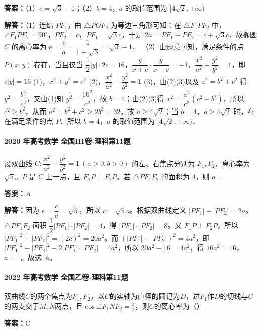 \documentclass[UTF8,a4paper,11pt]{ctexart}
\begin{document}
\textbf{答案：}（1）$e=\sqrt{3}-1$；（2）$b=4$，$a$ 的取值范围为 $[4\sqrt{2},+\infty)$\par

\textbf{解答：}（1）连结 $PF_1$，由 $\triangle POF_2$ 为等边三角形可知：在 $\triangle F_1PF_2$ 中，$\angle F_1PF_2=90^\circ$，$PF_2=c$，$PF_1=\sqrt{3}c$，于是 $2a=PF_1+PF_2=c+\sqrt{3}c$，故椭圆 $C$ 的离心率为 $e=\dfrac{c}{a}=\dfrac{1}{1+\sqrt{3}}=\sqrt{3}-1$．
（2）由题意可知，满足条件的点 $P(x,y)$ 存在，当且仅当 $\dfrac{1}{2}|y|\cdot2c=16$，$\dfrac{y}{x+c}\cdot\dfrac{y}{x-c}=-1$，$\dfrac{x^2}{a^2}+\dfrac{y^2}{b^2}=1$，即 $c|y|=16$ (1)，$x^2+y^2=c^2$ (2)，$\dfrac{x^2}{a^2}+\dfrac{y^2}{b^2}=1$ (3)，由(2)(3)以及 $a^2=b^2+c^2$ 得 $y^2=\dfrac{b^4}{c^2}$，又由(1)知 $y^2=\dfrac{16^2}{c^2}$，故 $b=4$；由(2)(3)得 $x^2=\dfrac{a^2}{c^2}(c^2-b^2)$，所以 $c^2\ge b^2$，从而 $a^2=b^2+c^2\ge 2b^2=32$，故 $a\ge 4\sqrt{2}$；当 $b=4$，$a\ge 4\sqrt{2}$ 时，存在满足条件的点 $P$．所以 $b=4$，$a$ 的取值范围为 $[4\sqrt{2},+\infty)$．

\paragraph{2020 年高考数学 全国III卷-理科第11题}

设双曲线 $C:\dfrac{x^2}{a^2}-\dfrac{y^2}{b^2}=1\ (a>0,b>0)$ 的左、右焦点分别为 $F_1,F_2$，离心率为 $\sqrt{5}$。$P$ 是 $C$ 上一点，且 $F_1P\perp F_2P$。若 $\triangle PF_1F_2$ 的面积为 $4$，则 $a=$

\textbf{答案：}$A$\par

\textbf{解答：}因为 $e=\dfrac{c}{a}=\sqrt{5}$，所以 $c=\sqrt{5}a$。根据双曲线定义 $|PF_1|-|PF_2|=2a$。$\triangle PF_1F_2$ 面积 $\dfrac12|PF_1|\cdot|PF_2|=4$，得 $|PF_1|\cdot|PF_2|=8$。又 $F_1P\perp F_2P$，所以 $|PF_1|^2+|PF_2|^2=(2c)^2=20a^2$。而 $(|PF_1|-|PF_2|)^2=4a^2$，即 $|PF_1|^2+|PF_2|^2-2|PF_1|\cdot|PF_2|=4a^2$，所以 $20a^2-16=4a^2$，得 $16a^2=16$，$a=1$。故选 $A$。

\paragraph{2022 年高考数学 全国乙卷-理科第11题}

双曲线$C$的两个焦点为$F_1, F_2$，以$C$的实轴为直径的圆记为$D$，过$F_1$作$D$的切线与$C$的两支交于$M, N$两点，且$\cos\angle F_1NF_2 = \frac{3}{5}$，则$C$的离心率为（\qquad）

\textbf{答案：}C\par
\end{document}
